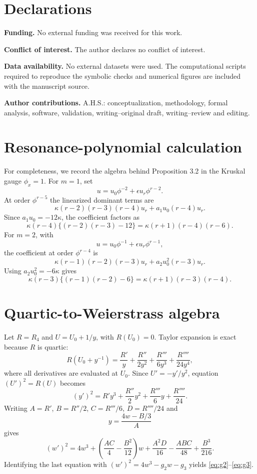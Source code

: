 \documentclass[11pt]{article}
\begin{document}
\section*{Declarations}
\textbf{Funding.} No external funding was received for this work.

\textbf{Conflict of interest.} The author declares no conflict of interest.

\textbf{Data availability.} No external datasets were used.  The computational scripts required to reproduce the symbolic checks and numerical figures are included with the manuscript source.

\textbf{Author contributions.} A.H.S.: conceptualization, methodology, formal analysis, software, validation, writing--original draft, writing--review and editing.

\appendix
\section{Resonance-polynomial calculation}
For completeness, we record the algebra behind Proposition 3.2 in the Kruskal gauge $\phi_x=1$.  For $m=1$, set
\[
 u=u_0\phi^{-2}+\epsilon u_r\phi^{r-2}.
\]
At order $\phi^{r-5}$ the linearized dominant terms are
\[
 \kappa(r-2)(r-3)(r-4)u_r
 +a_1u_0(r-4)u_r.
\]
Since $a_1u_0=-12\kappa$, the coefficient factors as
\[
 \kappa(r-4)\{(r-2)(r-3)-12\}
 =\kappa(r+1)(r-4)(r-6).
\]
For $m=2$, with
\[
 u=u_0\phi^{-1}+\epsilon u_r\phi^{r-1},
\]
the coefficient at order $\phi^{r-4}$ is
\[
 \kappa(r-1)(r-2)(r-3)u_r+a_2u_0^2(r-3)u_r.
\]
Using $a_2u_0^2=-6\kappa$ gives
\[
 \kappa(r-3)\{(r-1)(r-2)-6\}
 =\kappa(r+1)(r-3)(r-4).
\]

\section{Quartic-to-Weierstrass algebra}
Let $R=R_4$ and $U=U_0+1/y$, with $R(U_0)=0$.  Taylor expansion is exact because $R$ is quartic:
\[
 R(U_0+y^{-1})
 =\frac{R'}{y}+\frac{R''}{2y^2}+\frac{R'''}{6y^3}+\frac{R''''}{24y^4},
\]
where all derivatives are evaluated at $U_0$.  Since $U'=-y'/y^2$, equation $(U')^2=R(U)$ becomes
\[
 (y')^2=R'y^3+\frac{R''}{2}y^2+\frac{R'''}{6}y+\frac{R''''}{24}.
\]
Writing $A=R'$, $B=R''/2$, $C=R'''/6$, $D=R''''/24$ and
\[
 y=\frac{4w-B/3}{A}
\]
gives
\[
 (w')^2=4w^3+
 \left(\frac{AC}{4}-\frac{B^2}{12}\right)w
 +\frac{A^2D}{16}-\frac{ABC}{48}+\frac{B^3}{216}.
\]
Identifying the last equation with $(w')^2=4w^3-g_2w-g_3$ yields \eqref{eq:g2}--\eqref{eq:g3}.
\end{document}
